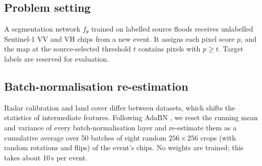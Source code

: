 \documentclass[a4paper,fleqn]{cas-sc}
\begin{document}
\subsection{Problem setting}
A segmentation network $f_\theta$ trained on labelled source floods receives unlabelled Sentinel-1 VV and VH chips from a new event. It assigns each pixel score $p$, and the map at the source-selected threshold $t$ contains pixels with $p\ge t$. Target labels are reserved for evaluation.

\subsection{Batch-normalisation re-estimation}
Radar calibration and land cover differ between datasets, which shifts the statistics of intermediate features. Following AdaBN \citep{li2018adabn}, we reset the running mean and variance of every batch-normalisation layer and re-estimate them as a cumulative average over 50 batches of eight random $256\times256$ crops (with random rotations and flips) of the event's chips. No weights are trained; this takes about 10\,s per event.
\end{document}
